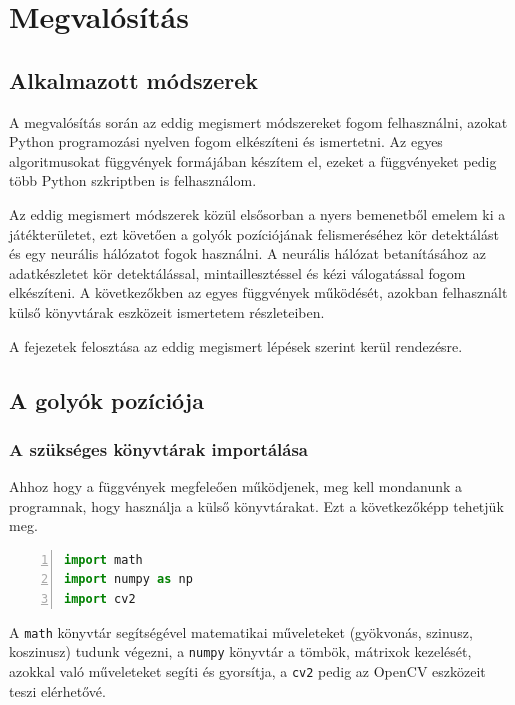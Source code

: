 \chapter{Megvalósítás}
\section{Alkalmazott módszerek}
A megvalósítás során az eddig megismert módszereket fogom felhasználni, azokat Python programozási nyelven fogom elkészíteni és ismertetni. Az egyes algoritmusokat függvények formájában készítem el, ezeket a függvényeket pedig több Python szkriptben is felhasználom.
\par Az eddig megismert módszerek közül elsősorban a nyers bemenetből emelem ki a játékterületet, ezt követően a golyók pozíciójának felismeréséhez kör detektálást és egy neurális hálózatot fogok használni. A neurális hálózat betanításához az adatkészletet kör detektálással, mintaillesztéssel és kézi válogatással fogom elkészíteni. A következőkben az egyes függvények működését, azokban felhasznált külső könyvtárak eszközeit ismertetem részleteiben.
\par A fejezetek felosztása az eddig megismert lépések szerint kerül rendezésre.

\section{A golyók pozíciója}

\subsection{A szükséges könyvtárak importálása}
Ahhoz hogy a függvények megfeleően működjenek, meg kell mondanunk a programnak, hogy használja a külső könyvtárakat.
\newline Ezt a következőképp tehetjük meg.

\vspace{2mm}\begin{lstlisting}[language=Python, numbers=left]
import math
import numpy as np
import cv2
\end{lstlisting}

\par A \lstinline{math} könyvtár segítségével matematikai műveleteket (gyökvonás, szinusz, koszinusz) tudunk végezni, a \lstinline{numpy} könyvtár a tömbök, mátrixok kezelését, azokkal való műveleteket segíti és gyorsítja, a \lstinline{cv2} pedig az OpenCV eszközeit teszi elérhetővé.

